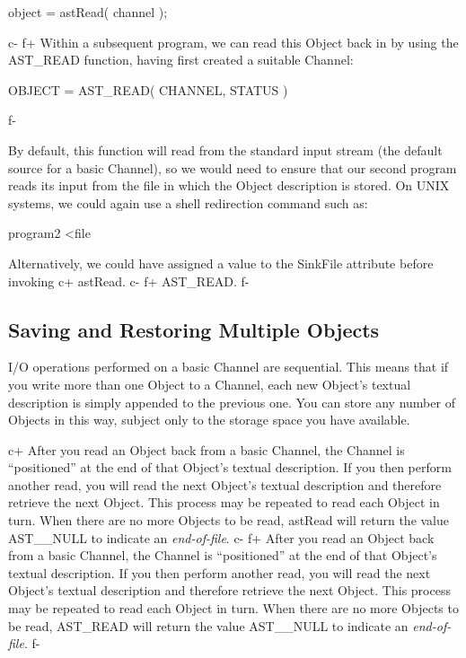 \documentclass[twoside,11pt]{starlink}
\begin{document}
{\small
\begin{terminalv}
object = astRead( channel );
\end{terminalv}
\normalsize
c-
f+
Within a subsequent program, we can read this Object back in by
using the AST\_READ function, having first created a suitable
Channel:

\small
\begin{terminalv}
      OBJECT = AST_READ( CHANNEL, STATUS )
\end{terminalv}
\normalsize
f-

By default, this function will read from the standard input stream
(the default source for a basic Channel), so we would need to ensure
that our second program reads its input from the file in which the
Object description is stored. On UNIX systems, we could again use a
shell redirection command such as:

\small
\begin{terminalv}
program2 <file
\end{terminalv}
\normalsize

Alternatively, we could have assigned a value to the SinkFile attribute
before invoking
c+
astRead.
c-
f+
AST\_READ.
f-

\subsection{Saving and Restoring Multiple Objects}

I/O operations performed on a basic Channel are sequential. This
means that if you write more than one Object to a Channel,
each new Object's textual description is simply appended to the
previous one. You can store any number of Objects in this way,
subject only to the storage space you have available.

c+
After you read an Object back from a basic Channel, the
Channel is ``positioned'' at the end of that Object's
textual description. If you then perform another read, you will
read the next Object's textual description and therefore
retrieve the next Object.  This process may be repeated to read
each Object in turn. When there are no more Objects to be
read, astRead will return the value AST\_\_NULL to indicate an
\emph{end-of-file}.
c-
f+
After you read an Object back from a basic Channel, the
Channel is ``positioned'' at the end of that Object's
textual description. If you then perform another read, you will
read the next Object's textual description and therefore
retrieve the next Object.  This process may be repeated to read
each Object in turn. When there are no more Objects to be
read, AST\_READ will return the value AST\_\_NULL to indicate an
\emph{end-of-file}.
f-

}
\end{document}
